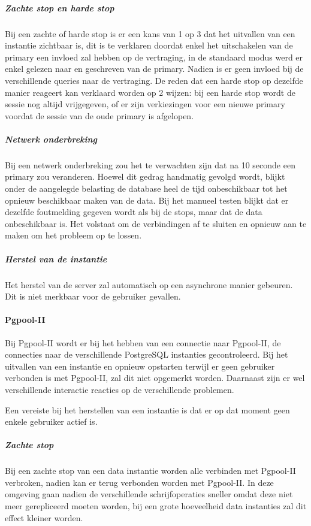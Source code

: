 \subparagraph{Zachte stop en harde stop} Bij een zachte of harde stop is er een kans van 1 op 3 dat het uitvallen van een instantie zichtbaar is, dit is te verklaren doordat enkel het uitschakelen van de primary een invloed zal hebben op de vertraging, in de standaard modus werd er enkel gelezen naar en geschreven van de primary. Nadien is er geen invloed bij de verschillende queries naar de vertraging. De reden dat een harde stop op dezelfde manier reageert kan verklaard worden op 2 wijzen: bij een harde stop wordt de sessie nog altijd vrijgegeven, of er zijn verkiezingen voor een nieuwe primary voordat de sessie van de oude primary is afgelopen. 

\subparagraph{Netwerk onderbreking} Bij een netwerk onderbreking zou het te verwachten zijn dat na 10 seconde een primary zou veranderen. Hoewel dit gedrag handmatig gevolgd wordt, blijkt onder de aangelegde belasting de database heel de tijd onbeschikbaar tot het opnieuw beschikbaar maken van de data. Bij het manueel testen blijkt dat er dezelfde foutmelding gegeven wordt als bij de stops, maar dat de data onbeschikbaar is. Het volstaat om de verbindingen af te sluiten en opnieuw aan te maken om het probleem op te lossen.

\subparagraph{Herstel van de instantie} Het herstel van de server zal automatisch op een asynchrone manier gebeuren. Dit is niet merkbaar voor de gebruiker gevallen. 

\paragraph{Pgpool-II} Bij Pgpool-II wordt er bij het hebben van een connectie naar Pgpool-II, de connecties naar de verschillende PostgreSQL instanties gecontroleerd. Bij het uitvallen van een instantie en opnieuw opstarten terwijl er geen gebruiker verbonden is met Pgpool-II, zal dit niet opgemerkt worden. Daarnaast zijn er wel verschillende interactie reacties op de verschillende problemen. 

Een vereiste bij het herstellen van een instantie is dat er op dat moment geen enkele gebruiker actief is. 

\subparagraph{Zachte stop} Bij een zachte stop van een data instantie worden alle verbinden met Pgpool-II verbroken, nadien kan er terug verbonden worden met Pgpool-II. In deze omgeving gaan nadien de verschillende schrijfoperaties sneller omdat deze niet meer gerepliceerd moeten worden, bij een grote hoeveelheid data instanties zal dit effect kleiner worden.  

